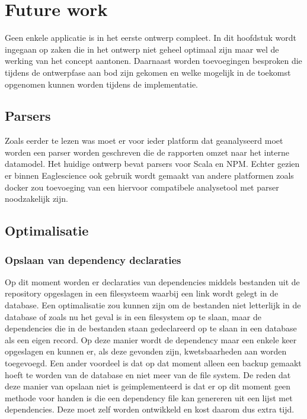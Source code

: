 
\chapter{Future work}\label{ch:name} %
Geen enkele applicatie is in het eerste ontwerp compleet. In dit hoofdstuk wordt ingegaan op zaken die in het ontwerp niet geheel optimaal zijn maar wel de werking van het concept aantonen.
Daarnaast worden toevoegingen besproken die tijdens de ontwerpfase aan bod zijn gekomen en welke mogelijk in de toekomst opgenomen kunnen worden tijdens de implementatie.


\section{Parsers}\label{sec:parsers}
Zoals eerder te lezen was moet er voor ieder platform dat geanalyseerd moet worden een parser worden geschreven die de rapporten omzet naar het interne datamodel. Het huidige ontwerp bevat parsers voor Scala en NPM. Echter gezien er binnen Eaglescience ook gebruik wordt gemaakt van andere platformen zoals docker zou toevoeging van een hiervoor compatibele analysetool met parser noodzakelijk zijn.

\section{Optimalisatie}\label{sec:optimalisatie}

\subsection{Opslaan van dependency declaraties}\label{subsec:opslaan-van-dependency-declaraties}
Op dit moment worden er declaraties van dependencies middels bestanden uit de repository opgeslagen in een filesysteem waarbij een link wordt gelegt in de database. Een optimalisatie zou kunnen zijn om de bestanden niet letterlijk in de database of zoals nu het geval is in een filesystem op te slaan, maar de dependencies die in de bestanden staan gedeclareerd op te slaan in een database als een eigen record. Op deze manier wordt de dependency maar een enkele keer opgeslagen en kunnen er, als deze gevonden zijn, kwetsbaarheden aan worden toegevoegd. Een ander voordeel is dat op dat moment alleen een backup gemaakt hoeft te worden van de database en niet meer van de file system. De reden dat deze manier van opslaan niet is geimplementeerd is dat er op dit moment geen methode voor handen is die een dependency file kan genereren uit een lijst met dependencies. Deze moet zelf worden ontwikkeld en kost daarom dus extra tijd. %


